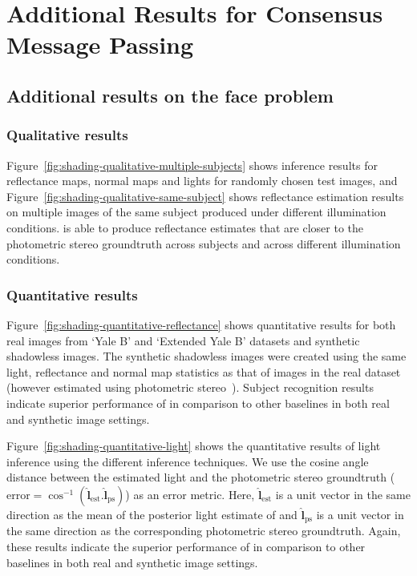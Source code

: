 \chapter{Additional Results for Consensus Message Passing}

\section{Additional results on the face problem}

\subsection{Qualitative results}

Figure~\ref{fig:shading-qualitative-multiple-subjects} shows inference results for reflectance maps, normal maps and lights for randomly chosen test images, and Figure~\ref{fig:shading-qualitative-same-subject} shows reflectance estimation results on multiple images of the same subject produced under different illumination conditions. \Method is able to produce reflectance estimates that are closer to the photometric stereo groundtruth across subjects and across different illumination conditions.

\subsection{Quantitative results}

Figure~\ref{fig:shading-quantitative-reflectance} shows quantitative results for both real images from `Yale B' and `Extended Yale B' datasets \citep{Georghiades2001, Lee2005} and synthetic shadowless images. The synthetic shadowless images were created using the same light, reflectance and normal map statistics as that of images in the real dataset (however estimated using photometric stereo~\citep{Queau2013}). Subject recognition results indicate superior performance of \MTD in comparison to other baselines in both real and synthetic image settings.

Figure~\ref{fig:shading-quantitative-light} shows the quantitative results of light inference using the different inference techniques. We use the cosine angle distance between the estimated light and the photometric stereo groundtruth ($\textrm{error} = \cos^{-1}(\hat{\mathbf{l}}_\textrm{est}.\hat{\mathbf{l}}_\textrm{ps})$) as an error metric. Here, $\hat{\mathbf{l}}_\textrm{est}$ is a unit vector in the same direction as the mean of the posterior light estimate of \MTD and $\hat{\mathbf{l}}_\textrm{ps}$ is a unit vector in the same direction as the corresponding photometric stereo groundtruth. Again, these results indicate the superior performance of \MTD in comparison to other baselines in both real and synthetic image settings.


